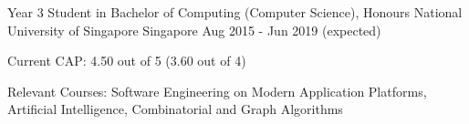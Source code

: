 

\begin{cventries}

  \cventry
  {Year 3 Student in Bachelor of Computing (Computer Science), Honours} %
  {National University of Singapore} %
  {Singapore} %
  {Aug 2015 - Jun 2019 (expected)} %
  {
    \begin{cvitems} %
    \item {Current CAP: 4.50 out of 5 (3.60 out of 4)}
    \item {Relevant Courses: Software Engineering on Modern Application Platforms, Artificial Intelligence, Combinatorial and Graph Algorithms}
    \end{cvitems}
  }

\end{cventries}
